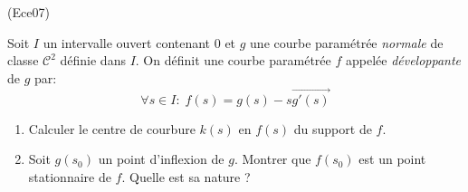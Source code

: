 \begin{tiny}(Ece07)\end{tiny} Soit $I$ un intervalle ouvert contenant $0$ et $g$ une courbe paramétrée \emph{normale} de classe $\mathcal C^2$ définie dans $I$. On définit une courbe paramétrée $f$ appelée \emph{ développante} de $g$ par:
\begin{displaymath}
 \forall s \in I:\; f(s) = g(s)-s\overrightarrow{g'(s)}
\end{displaymath}
 \begin{enumerate}
  \item Calculer le centre de courbure $k(s)$ en $f(s)$ du support de $f$.
  \item Soit $g(s_0)$ un point d'inflexion de $g$. Montrer que $f(s_0)$ est un point stationnaire de $f$. Quelle est sa nature ?
 \end{enumerate}

